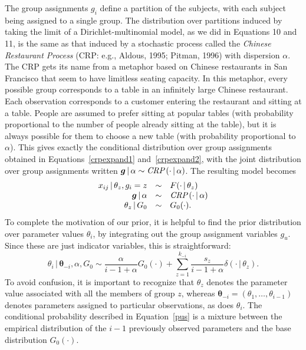 \documentclass[authoryear]{elsarticle}
\newcommand{\condon}{\,|\,}
\newcommand{\vctr}[1]{\bm{#1}}
\begin{document}
The group assignments $g_i$ define a partition of the subjects, with each
subject being assigned to a single group. The distribution over partitions
induced by taking the limit of a Dirichlet-multinomial model, as we did in
Equations 10 and 11, is the same as that induced by a stochastic process
called the {\it Chinese Restaurant Process} (CRP: e.g., Aldous, 1995;
Pitman, 1996) with dispersion $\alpha$.  The CRP gets its name from a
metaphor based on Chinese restaurants in San Francisco that seem to have
limitless seating capacity. In this metaphor, every possible group
corresponds to a table in an infinitely large Chinese restaurant. Each
observation corresponds to a customer entering the restaurant and sitting
at a table. People are assumed to prefer sitting at popular tables (with
probability proportional to the number of people already sitting at the
table), but it is always possible for them to choose a new table (with
probability proportional to $\alpha$). This gives exactly the conditional
distribution over group assignments obtained in Equations~\ref{crpexpand1}
and~\ref{crpexpand2}, with the joint distribution over group assignments
written $\vctr{g} \condon \alpha \sim \mbox{{\it CRP}}\,(\cdot \condon
\alpha)$. The resulting model becomes
\begin{equation}
        \label{igm_crp}
        \begin{array}{rcl}
        x_{ij} \condon \theta_z, g_i=z & \sim & F(\cdot \condon \theta_z)\\
        \vctr{g} \condon \alpha &\sim& \mbox{{\it CRP}}\,(\cdot \condon \alpha) \\
        \theta_z \condon G_0 & \sim & G_0(\cdot).
        \end{array}
\end{equation}
To complete the motivation of our prior, it is helpful to find the prior
distribution over parameter values $\theta_i$, by integrating out the group
assignment variables $g_u$. Since these are just indicator variables, this is
straightforward:
\begin{equation}
        \theta_{i} \condon \vctr{\theta}_{-i},  \alpha, G_0 \sim
        \frac{\alpha}{i-1+\alpha} G_0(\cdot) + \sum_{z=1}^{k_{-i}}
        \frac{s_z}{i-1+\alpha}  \delta(\cdot \condon {\theta_z}).
        \label{pus}
\end{equation}
To avoid confusion, it is important to recognize that $\theta_z$ denotes the
parameter value associated with all the members of group $z$, whereas
$\vctr{\theta}_{-i}=(\theta_1, \ldots, \theta_{i-1})$ denotes parameters assigned
to particular observations, as does $\theta_i$. The conditional probability
described in Equation~\ref{pus} is a mixture between the empirical
distribution of the $i-1$ previously observed parameters and the base
distribution $G_0(\cdot)$.
\end{document}
